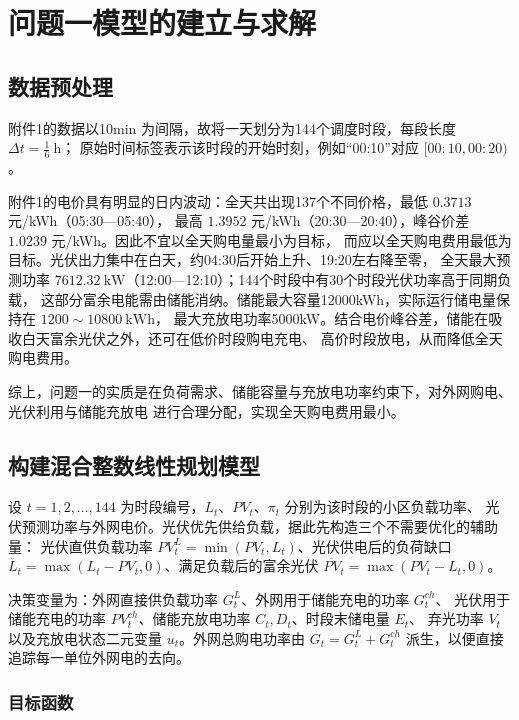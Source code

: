 \section{问题一模型的建立与求解}
\subsection{数据预处理}

附件1的数据以10min 为间隔，故将一天划分为144个调度时段，每段长度 \(\Delta t=\frac{1}{6}\ \mathrm{h}\)；
原始时间标签表示该时段的开始时刻，例如“00:10”对应 \([00:10,00:20)\)。

附件1的电价具有明显的日内波动：全天共出现137个不同价格，最低 \(0.3713\) 元/kWh（05:30—05:40），
最高 \(1.3952\) 元/kWh（20:30—20:40），峰谷价差 \(1.0239\) 元/kWh。因此不宜以全天购电量最小为目标，
而应以全天购电费用最低为目标。光伏出力集中在白天，约04:30后开始上升、19:20左右降至零，
全天最大预测功率 \(7612.32\ \mathrm{kW}\)（12:00—12:10）；144个时段中有30个时段光伏功率高于同期负载，
这部分富余电能需由储能消纳。储能最大容量12000kWh，实际运行储电量保持在 \(1200\sim10800\ \mathrm{kWh}\)，
最大充放电功率5000kW。结合电价峰谷差，储能在吸收白天富余光伏之外，还可在低价时段购电充电、
高价时段放电，从而降低全天购电费用。

综上，问题一的实质是在负荷需求、储能容量与充放电功率约束下，对外网购电、光伏利用与储能充放电
进行合理分配，实现全天购电费用最小。

\subsection{构建混合整数线性规划模型}

设 \(t=1,2,\ldots,144\) 为时段编号，\(L_t\)、\(PV_t\)、\(\pi_t\) 分别为该时段的小区负载功率、
光伏预测功率与外网电价。光伏优先供给负载，据此先构造三个不需要优化的辅助量：
光伏直供负载功率 \(PV_t^{L}=\min(PV_t,L_t)\)、光伏供电后的负荷缺口
\(\overline L_t=\max(L_t-PV_t,0)\)、满足负载后的富余光伏 \(\overline{PV}_t=\max(PV_t-L_t,0)\)。

决策变量为：外网直接供负载功率 \(G_t^L\)、外网用于储能充电的功率 \(G_t^{ch}\)、
光伏用于储能充电的功率 \(PV_t^{ch}\)、储能充放电功率 \(C_t,D_t\)、时段末储电量 \(E_t\)、
弃光功率 \(V_t\) 以及充放电状态二元变量 \(u_t\)。外网总购电功率由
\(G_t=G_t^L+G_t^{ch}\) 派生，以便直接追踪每一单位外网电的去向。

\subsubsection{目标函数}

